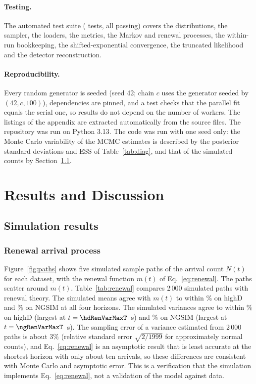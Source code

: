 \documentclass[11pt,a4paper]{article}
\numberwithin{equation}{section}
\begin{document}
\paragraph{Testing.} The automated test suite (\nTests{} tests, all passing) covers the distributions, the sampler, the loaders, the metrics, the Markov and renewal processes, the within-run bookkeeping, the shifted-exponential convergence, the truncated likelihood and the detector reconstruction.
\paragraph{Reproducibility.} Every random generator is seeded (seed 42; chain $c$ uses the generator seeded by $(42,c,100)$), dependencies are pinned, and a test checks that the parallel fit equals the serial one, so results do not depend on the number of workers. The listings of the appendix are extracted automatically from the source files. The repository was run on Python 3.13.
The code was run with one seed only: the Monte Carlo variability of the MCMC estimates is described by the posterior standard deviations and ESS of Table~\ref{tab:diag}, and that of the simulated counts by Section~\ref{sec:sim}.

\section{Results and Discussion}\label{sec:results}

\subsection{Simulation results}\label{sec:sim}
\subsubsection{Renewal arrival process}
Figure~\ref{fig:paths} shows five simulated sample paths of the arrival count $N(t)$ for each dataset, with the renewal function $m(t)$ of
Eq.~\eqref{eq:renewal}. The paths scatter around $m(t)$. Table~\ref{tab:renewal} compares 2\,000 simulated paths with renewal theory. The
simulated means agree with $m(t)$ to within \hdRenMeanMax\% on highD and \ngRenMeanMax\% on NGSIM at all four horizons. The simulated variances agree to within \hdRenVarMax\% on highD (largest at $t=\hdRenVarMaxT$~s) and \ngRenVarMax\% on NGSIM (largest at $t=\ngRenVarMaxT$~s).
The sampling error of a variance estimated from 2\,000 paths is about 3\% (relative standard error $\sqrt{2/1999}$ for approximately normal counts), and Eq.~\eqref{eq:renewal} is an asymptotic result that is least accurate at the shortest horizon with only about ten arrivals, so these differences are consistent with Monte Carlo and asymptotic error.
This is a verification that the simulation implements Eq.~\eqref{eq:renewal}, not a validation of the model against data.
\end{document}
